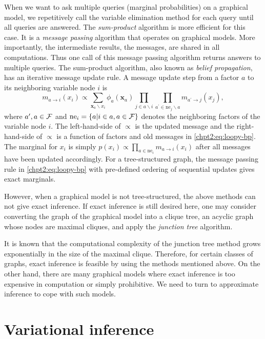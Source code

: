 When we want to ask multiple queries (marginal probabilities) on a graphical model, we repetitively call the variable elimination method for each query until all queries are answered. The \textit{sum-product} algorithm is more efficient for this case. It is a \textit{message passing} algorithm that operates on graphical models. More importantly, the intermediate results, the messages, are shared in all computations. Thus one call of this message passing algorithm returns answers to multiple queries. The sum-product algorithm, also known as \textit{belief propagation}, has an iterative message update rule. A message update step from a factor $a$ to its neighboring variable node $i$ is 
\begin{equation}\label{chpt2:eq:loopy-bp}
  m_{a\rightarrow i}(x_i) \propto \sum_{\bm{x}_{a} \backslash x_i}
  \phi_{a}(\bm{x}_{a}) \prod_{j \in a \backslash i} \prod_{a^{\prime} \in \mathrm{ne}_j
    \backslash a} m_{a^{\prime}\rightarrow j}(x_j),
\end{equation}
where $a^\prime, a \in \mathcal{F}$ and $\mathrm{ne}_i = \left\{ a | i \in a, a \in \mathcal{F} \right\}$ denotes the neighboring factors of the variable node $i$. The left-hand-side of $\propto$ is the updated message and the right-hand-side of $\propto$ is a function of factors and old messages in \eqref{chpt2:eq:loopy-bp}. The marginal for $x_i$ is simply $p(x_i)\propto\prod_{a\in\mathrm{ne}_i}m_{a\rightarrow i}(x_i)$ after all messages have been updated accordingly. For a tree-structured graph, the message passing rule in \eqref{chpt2:eq:loopy-bp} with pre-defined ordering of sequential updates gives exact marginals.

However, when a graphical model is not tree-structured, the above methods can not give exact inference. If exact inference is still desired here, one may consider converting the graph of the graphical model into a clique tree, an acyclic graph whose nodes are maximal cliques, and apply the \textit{junction tree} algorithm.

It is known that the computational complexity of the junction tree method grows exponentially in the size of the maximal clique. Therefore, for certain classes of graphs, exact inference is feasible by using the methods mentioned above. On the other hand, there are many graphical models where exact inference is too expensive in computation or simply prohibitive. We need to turn to approximate inference to cope with such models.


\section{Variational inference}
\label{chpt2:sec:variational-inference}


